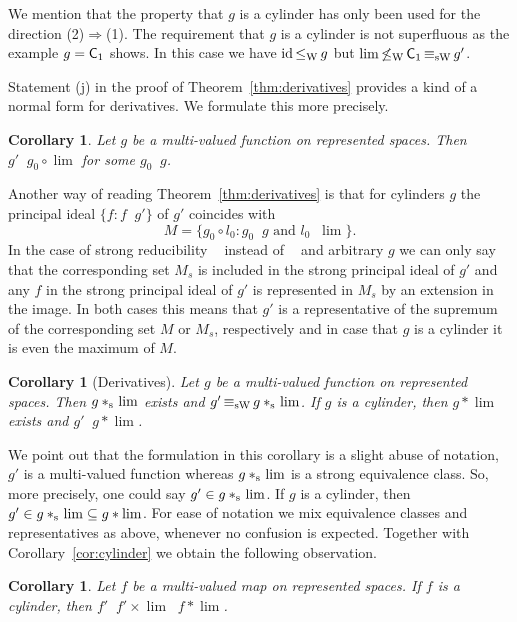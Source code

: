 \documentclass[a4paper]{amsart}
\def\TO{\Longrightarrow}
\def\In{\subseteq}
\def\id{{\rm id}}
\def\C{\mbox{\rm\sffamily C}}
\def\leqW{\mathop{\leq_{\mathrm{W}}}}
\def\equivW{\mathop{\equiv_{\mathrm{W}}}}
\def\leqSW{\mathop{\leq_{\mathrm{sW}}}}
\def\equivSW{\mathop{\equiv_{\mathrm{sW}}}}
\def\nleqW{\mathop{\not\leq_{\mathrm{W}}}}
\def\stars{*_{\rm s}\;\!}
\newtheorem{corollary}[theorem]{Corollary}
\theoremstyle{definition}
\begin{document}
We mention that the property that $g$ is a cylinder has only been used for the direction (2)$\TO$(1).
The requirement that $g$ is a cylinder is not superfluous as the example $g=\C_1$ shows. 
In this case we have $\id\leqW g$ but $\lim\nleqW\C_1\equivSW g'$.

Statement (j) in the proof of Theorem~\ref{thm:derivatives} provides a kind of a normal form for derivatives.
We formulate this more precisely.

\begin{corollary}
\label{cor:derivatives-composition}
Let $g$ be a multi-valued function on represented spaces. Then $g'\equivSW g_0\circ \lim$ for some
$g_0\equivSW g$.
\end{corollary}

Another way of reading Theorem~\ref{thm:derivatives} is that for cylinders $g$ the principal ideal $\{f:f\leqW g'\}$
of $g'$ coincides with
\[M=\{g_0\circ l_0:g_0\leqW g\mbox{ and }l_0\leqW\lim\}.\]
In the case of strong reducibility $\leqSW$ instead of $\leqW$ and arbitrary $g$ we can only say
that the corresponding set $M_s$ is included in the strong principal ideal of $g'$ and any $f$
in the strong principal ideal of $g'$ is represented in $M_s$ by an extension in the image.
In both cases this means that $g'$ is a representative of the supremum of the corresponding
set $M$ or $M_s$, respectively and in case that $g$ is a cylinder it is even the maximum of $M$.

\begin{corollary}[Derivatives]
\label{cor:derivatives}
Let $g$ be a multi-valued function on represented spaces. Then $g\stars\lim$ exists and
$g'\equivSW g\stars\lim$.
If $g$ is a cylinder, then $g*\lim$ exists and $g'\equivW g*\lim$.
\end{corollary}

We point out that the formulation in this corollary is a slight abuse of notation, $g'$ is a multi-valued
function whereas $g\stars\lim$ is a strong equivalence class. So, more precisely, one could say
$g'\in g\stars\lim$. If $g$ is a cylinder, then $g'\in g\stars\lim\In g*\lim$. For ease of notation 
we mix equivalence classes and representatives as above, whenever no confusion is expected.
Together with Corollary~\ref{cor:cylinder} we obtain the following observation.

\begin{corollary}
\label{cor:products-composition-cylinder}
Let $f$ be a multi-valued map on represented spaces. If $f$ is a cylinder, then
$f'\equivW f'\times\lim\equivW f*\lim$.
\end{corollary}
\end{document}
